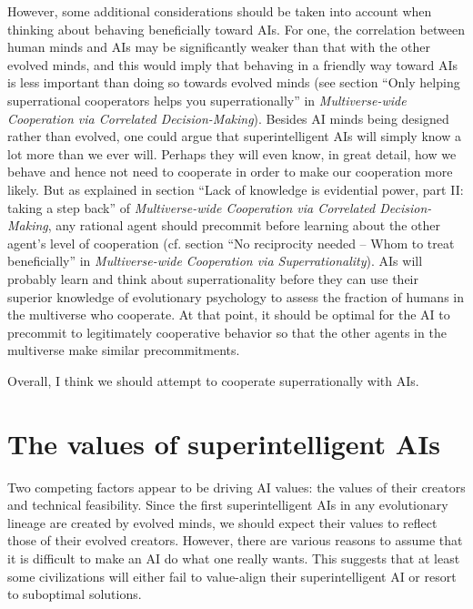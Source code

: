 \documentclass[]{article}
\begin{document}
However, some additional considerations should be taken into account
when thinking about behaving beneficially toward AIs. For one, the
correlation between human minds and AIs may be significantly weaker than
that with the other evolved minds, and this would imply that behaving in
a friendly way toward AIs is less important than doing so towards
evolved minds (see section ``Only helping superrational cooperators
helps you superrationally'' in \emph{Multiverse-wide Cooperation via
Correlated Decision-Making}).
Besides AI minds being designed rather than evolved, one could argue that superintelligent AIs will
simply know a lot more than we ever will. Perhaps they will even know,
in great detail, how we behave and hence not need to cooperate in order
to make our cooperation more likely. But as explained in section
``Lack
of knowledge is evidential power, part II: taking a step back'' of
\emph{Multiverse-wide Cooperation via Correlated Decision-Making}, 
any rational
agent should precommit before learning about the other agent's level of
cooperation (cf. section
``No reciprocity needed -- Whom to treat
beneficially'' in \emph{Multiverse-wide Cooperation
via Superrationality}).
AIs will probably learn and think about superrationality before they can use their superior knowledge of
evolutionary psychology to assess the fraction of humans in the
multiverse who cooperate. At that point, it should be optimal for the AI
to precommit to legitimately cooperative behavior so that the other
agents in the multiverse make similar precommitments.

Overall, I think we should attempt to cooperate superrationally with
AIs.

\section{The values of superintelligent AIs}
\label{the-values-of-superintelligent-ais}

Two competing factors appear to be driving AI values: the values of
their creators and technical feasibility. Since the first
superintelligent AIs in any evolutionary lineage are created by evolved
minds, we should expect their values to reflect those of their evolved
creators. However, there are various reasons to assume that it is
difficult to make an AI do what one really wants. This suggests that at
least some civilizations will either fail to value-align their
superintelligent AI or resort to suboptimal solutions.
\end{document}
